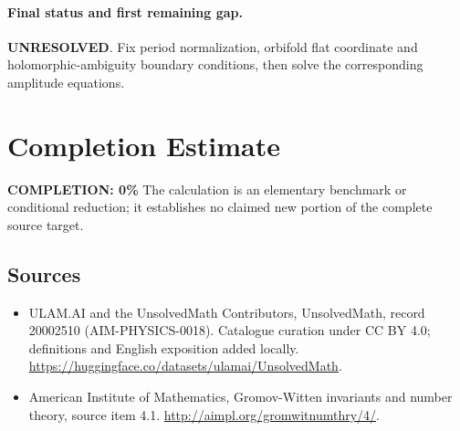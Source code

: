 \documentclass[11pt]{article}
\begin{document}
\paragraph{Final status and first remaining gap.}
\textbf{UNRESOLVED}. Fix period normalization, orbifold flat coordinate and holomorphic-ambiguity boundary conditions, then solve the corresponding amplitude equations.

\section{Completion Estimate}
\noindent\textbf{COMPLETION: 0\%}
The calculation is an elementary benchmark or conditional reduction; it establishes no claimed new portion of the complete source target.

\subsection{Sources}
\begin{itemize}
\item[\hypertarget{source:20002510:1}{S1}] ULAM.AI and the UnsolvedMath Contributors, UnsolvedMath, record 20002510 (AIM-PHYSICS-0018). Catalogue curation under CC BY 4.0; definitions and English exposition added locally.
\url{https://huggingface.co/datasets/ulamai/UnsolvedMath}.
\item[\hypertarget{source:20002510:2}{S2}] American Institute of Mathematics, Gromov-Witten invariants and number theory, source item 4.1.
\url{http://aimpl.org/gromwitnumthry/4/}.
\end{itemize}
\label{end:20002510}
\end{document}
